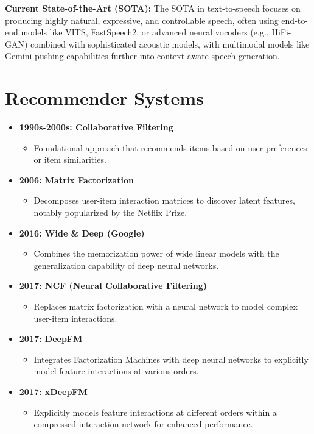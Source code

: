 \documentclass{article}
\begin{document}
\textbf{Current State-of-the-Art (SOTA):} The SOTA in text-to-speech focuses on producing highly natural, expressive, and controllable speech, often using end-to-end models like VITS, FastSpeech2, or advanced neural vocoders (e.g., HiFi-GAN) combined with sophisticated acoustic models, with multimodal models like Gemini pushing capabilities further into context-aware speech generation.

\section{Recommender Systems}
\begin{itemize}[leftmargin=1.5em]
\item \textbf{1990s-2000s: Collaborative Filtering}
  \begin{itemize}
    \item Foundational approach that recommends items based on user preferences or item similarities.
  \end{itemize}
\item \textbf{2006: Matrix Factorization}
  \begin{itemize}
    \item Decomposes user-item interaction matrices to discover latent features, notably popularized by the Netflix Prize.
  \end{itemize}
\item \textbf{2016: Wide \& Deep (Google)}
  \begin{itemize}
    \item Combines the memorization power of wide linear models with the generalization capability of deep neural networks.
  \end{itemize}
\item \textbf{2017: NCF (Neural Collaborative Filtering)}
  \begin{itemize}
    \item Replaces matrix factorization with a neural network to model complex user-item interactions.
  \end{itemize}
\item \textbf{2017: DeepFM}
  \begin{itemize}
    \item Integrates Factorization Machines with deep neural networks to explicitly model feature interactions at various orders.
  \end{itemize}
\item \textbf{2017: xDeepFM}
  \begin{itemize}
    \item Explicitly models feature interactions at different orders within a compressed interaction network for enhanced performance.

\end{itemize}
\end{itemize}
\end{document}
